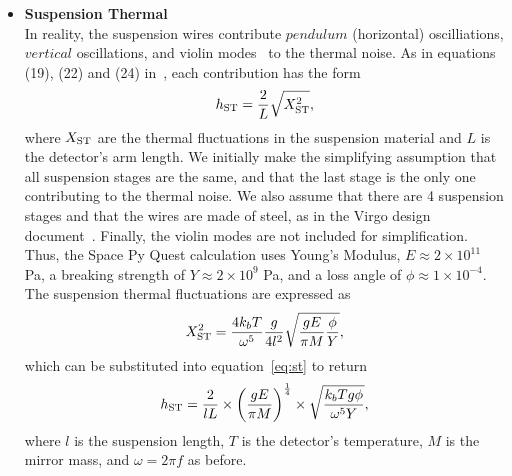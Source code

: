 \documentclass{article}
\begin{document}
\begin{itemize}
      \item\textbf{Suspension Thermal}\\
    In reality, the suspension wires contribute $pendulum$
    (horizontal) oscilliations, $vertical$ oscillations, and violin
    modes~\cite{violin} to the thermal noise. As in equations (19),
    (22) and (24) in~\cite{Virgo-sens}, each contribution has the form
    \begin{equation}
    \label{eq:st}
    h_{\rm ST} = \frac{2}{L}\sqrt{X_{\rm ST}^2}, 
    \end{equation}
    where $X_{\rm ST}$ are the thermal fluctuations in the suspension
    material and $L$ is the detector's arm length. We initially make
    the simplifying assumption that all suspension stages are the
    same, and that the last stage is the only one contributing to the
    thermal noise. We also assume that there are 4 suspension stages
    and that the wires are made of steel, as in the Virgo design
    document~\cite{Virgo-sens}. Finally, the violin modes are not included
    for simplification. 
    Thus, the Space Py Quest calculation uses Young's Modulus, $E
    \approx 2 \times 10^{11}$ Pa, a breaking strength of $Y \approx 2
    \times 10^9$ Pa, and a loss angle of $\phi \approx 1 \times
    10^{-4}$. The suspension thermal fluctuations are expressed as
\begin{equation}
X_{\rm ST}^2 = \frac{4k_bT}{\omega^5}\frac{g}{4l^2}\sqrt{\frac{gE}{\pi M}\frac{\phi}{Y}},
\end{equation}
which can be substituted into equation~\ref{eq:st} to return
    \begin{equation}
        \label{eqn::suspension}
        h_{\rm ST} = \frac{2}{lL}\times\left(\frac{gE}{\pi M}\right)^{\frac{1}{4}}\times\sqrt{\frac{k_bTg\phi}{\omega^5Y}},
    \end{equation}
        where $l$ is the suspension length, $T$ is the detector's
        temperature, $M$ is the mirror mass, and $\omega = 2\pi f$ as
        before.
  \end{itemize}
\end{document}
